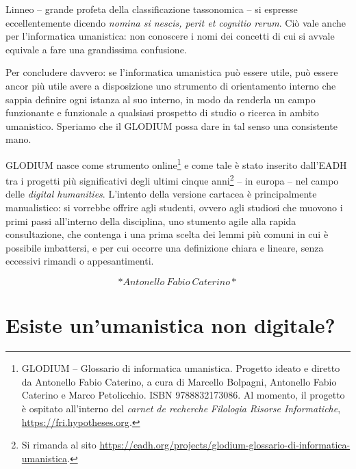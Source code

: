 \documentclass[
  b5paper,
  twoside,
  12pt,
  chapterprefix=false,
  bibliography=totocnumbered,
  parskip=false]{scrbook}
\begin{document}
Linneo -- grande profeta della classificazione tassonomica -- si
espresse eccellentemente dicendo \emph{nomina si nescis, perit et cognitio
rerum}. Ciò vale anche per l'informatica umanistica: non conoscere i
nomi dei concetti di cui si avvale equivale a fare una grandissima
confusione.

Per concludere davvero: se l'informatica umanistica può essere utile,
può essere ancor più utile avere a disposizione uno strumento di
orientamento interno che sappia definire ogni istanza al suo interno, in
modo da renderla un campo funzionante e funzionale a qualsiasi prospetto
di studio o ricerca in ambito umanistico. Speriamo che il GLODIUM possa
dare in tal senso una consistente mano.

GLODIUM nasce come strumento online\footnote{GLODIUM -- Glossario di informatica umanistica. Progetto ideato e
  diretto da Antonello Fabio Caterino, a cura di Marcello Bolpagni,
  Antonello Fabio Caterino e Marco Petolicchio. ISBN 9788832173086. Al
  momento, il progetto è ospitato all'interno del \emph{carnet de
  recherche} \emph{Filologia Risorse Informatiche},
  \url{https://fri.hypotheses.org}.} e come tale è stato inserito
dall'EADH tra i progetti più significativi degli ultimi cinque anni\footnote{Si rimanda al sito
  \url{https://eadh.org/projects/glodium-glossario-di-informatica-umanistica}.}
-- in europa -- nel campo delle \emph{digital humanities}. L'intento della
versione cartacea è principalmente manualistico: si vorrebbe offrire
agli studenti, ovvero agli studiosi che muovono i primi passi
all'interno della disciplina, uno stumento agile alla rapida
consultazione, che contenga i una prima scelta dei lemmi più comuni in
cui è possibile imbattersi, e per cui occorre una definizione chiara e
lineare, senza eccessivi rimandi o appesantimenti.

\[*Antonello~Fabio~Caterino*\]

\hypertarget{esiste-unumanistica-non-digitale}{%
\chapter*{Esiste un'umanistica non digitale?}\label{esiste-unumanistica-non-digitale}}

\end{document}
